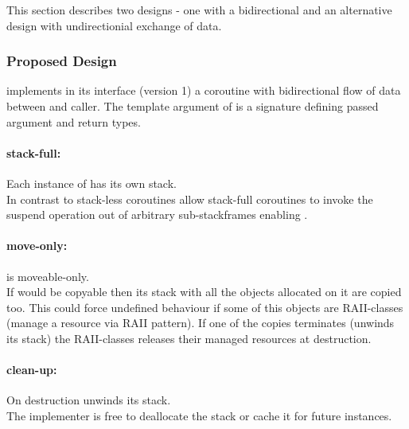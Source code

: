 This section describes two designs - one with a bidirectional and an alternative
design with undirectionial exchange of data.\\

\subsubsection*{Proposed Design}
\boostcoroutine implements in its interface (version 1) a coroutine with
bidirectional flow of data between \corofunction and caller. The template
argument of \coro is a signature defining passed argument and return types.

\paragraph*{stack-full:}
Each instance of \coro has its own stack.\\
\newline
In contrast to stack-less coroutines allow stack-full coroutines to invoke the
suspend operation out of arbitrary sub-stackframes enabling \escreops.

\paragraph*{move-only:}
\coro is moveable-only.\\
\newline
If \coro would be copyable then its stack with all the objects allocated on it
are copied too. This could force undefined behaviour if some of this objects are
RAII-classes (manage a resource via RAII pattern). If one of the \coro copies
terminates (unwinds its stack) the RAII-classes releases their managed resources
at destruction.

\paragraph*{clean-up:}
On destruction \coro unwinds its stack.\\
\newline
The implementer is free to deallocate the stack or cache it for future \coro
instances.


